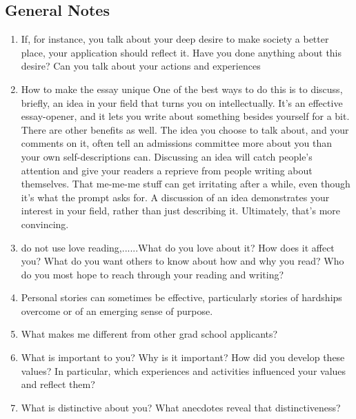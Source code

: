 \documentclass[a4paper,12pt]{article}%
\begin{document}
\subsection{General Notes}
\label{sec:General}
  \begin{enumerate}
	\item  If, for instance, you talk about your deep desire to make society a better place, your application should reflect it. Have you done anything about this desire? Can you talk about your actions and experiences\\
	  \hrulefill
	  
	  \hrulefill
	  
	  	  \hrulefill
	  	  
	  \hrulefill
\item How to make the essay unique 
 One of the best ways to do this is to discuss, briefly, an idea in your field that turns you on intellectually. It's an effective essay-opener, and it lets you write about something besides yourself for a bit. There are other benefits as well. The idea you choose to talk about, and your comments on it, often tell an admissions committee more about you than your own self-descriptions can.
Discussing an idea will catch people's attention and give your readers a reprieve from people writing about themselves. That me-me-me  stuff can get irritating after a while, even though it's what the prompt asks for. A discussion of an idea demonstrates your interest in your field, rather than just describing it. Ultimately, that's more convincing.\\

	  \hrulefill
	  
	  \hrulefill
\item do not use love reading,......What do you love about it? How does it affect you? What do you want others to know about how and why you read? Who do you most hope to reach through your reading and writing?\\

	  \hrulefill
	  
	  \hrulefill
	  
\item Personal stories can sometimes be effective, particularly stories of hardships overcome or of an emerging sense of purpose. 
\item  	What makes me different from other grad school applicants?
\item What is important to you? Why is it important? How did you develop these values? In particular, which  experiences and activities influenced your values and reflect them?
\item What is distinctive about you? What anecdotes reveal that distinctiveness?\\


\end{enumerate}
\end{document}
